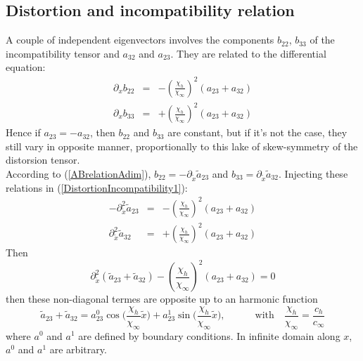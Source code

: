 \documentclass[
10pt, %
a4paper, %
oneside, %
headinclude,footinclude, %
table
]{scrartcl}
\begin{document}
\subsection{Distortion and incompatibility relation}
A couple of independent eigenvectors involves the components $b_{22}$, $b_{33}$ of the incompatibility tensor and $a_{32}$ and $a_{23}$. They are related to the differential equation:
\begin{equation}\label{DistortionIncompatibility1}
\begin{array}{rcl}
\partial_{x}b_{22}&=&-(\frac{\chi_{h}}{\chi_{\infty}})^2\left(a_{23}+a_{32}\right)\\
\partial_{x}b_{33}&=&+(\frac{\chi_{h}}{\chi_{\infty}})^2\left(a_{23}+a_{32}\right)
\end{array}
\end{equation}
Hence if $a_{23}=-a_{32}$, then $b_{22}$ and $b_{33}$ are constant, but if it's not the case, they still vary in opposite manner, proportionally to this lake of skew-symmetry of the distorsion tensor. \\
According to (\ref{ABrelationAdim}), $b_{22}=-\partial_{\tilde{x}}\tilde{a}_{23}$ and $b_{33}=\partial_{\tilde{x}}\tilde{a}_{32}$. Injecting these relations in (\ref{DistortionIncompatibility1}):
\begin{equation}\label{DistortionIncompatibility2}
\begin{array}{rcl}
-\partial_{\tilde{x}}^2\tilde{a}_{23}&=&-(\frac{\chi_{h}}{\chi_{\infty}})^2\left(a_{23}+a_{32}\right)\\
\partial_{\tilde{x}}^2\tilde{a}_{32}&=&+(\frac{\chi_{h}}{\chi_{\infty}})^2\left(a_{23}+a_{32}\right)
\end{array}
\end{equation}
Then 
$$
\partial_{\tilde{x}}^2(\tilde{a}_{23}+\tilde{a}_{32})-(\frac{\chi_{h}}{\chi_{\infty}})^2\left(a_{23}+a_{32}\right)=0
$$
then these non-diagonal termes are opposite up to an harmonic function 
$$
\tilde{a}_{23}+\tilde{a}_{32}=a_{23}^0\cos{(\frac{\chi_{h}}{\chi_{\infty}}\tilde{x}})+a_{23}^1\sin{(\frac{\chi_{h}}{\chi_{\infty}}\tilde{x}}),
\quad\quad\quad\textrm{with}\quad
\frac{\chi_{h}}{\chi_{\infty}}=\frac{c_{h}}{c_{\infty}}
$$
where $a^0$ and $a^1$ are defined by boundary conditions. In infinite domain along $x$, $a^0$ and $a^1$ are arbitrary. 
\end{document}
